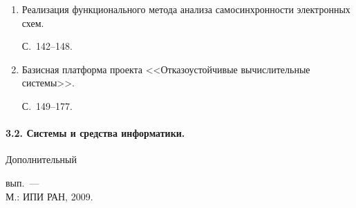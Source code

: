 \begin{enumerate}[1.]
перевода и обработки знаний. С.~119--141.





\item {}


Реализация функционального метода ана\-ли\-за самосинхронности электронных схем. 


С.~142--148.





\item {}


Базисная платформа проекта <<Отказоустойчивые вычислительные системы>>. 


С.~149--177.


\end{enumerate}





\paragraph{3.2. Системы и средства информатики.} Дополнительный 


вып.~---\\


М.: ИПИ РАН, 2009.





\vspace*{3pt}





\noindent


